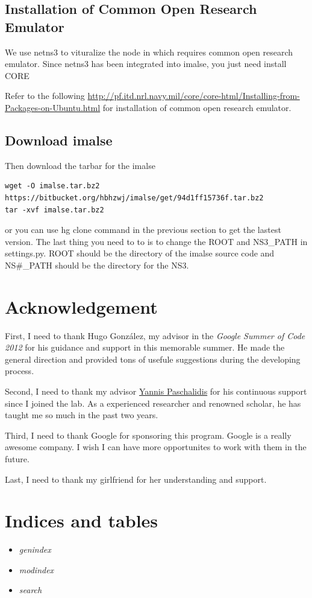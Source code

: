 \documentclass[letterpaper,10pt,english]{sphinxmanual}
\begin{document}
\section{Installation of Common Open Research Emulator}
\label{index:installation-of-common-open-research-emulator}
We use netns3 to vituralize the node in which requires common open research
emulator. Since netns3 has been integrated into imalse, you just need install
CORE

Refer to the following
\href{http://pf.itd.nrl.navy.mil/core/core-html/Installing-from-Packages-on-Ubuntu.html}{http://pf.itd.nrl.navy.mil/core/core-html/Installing-from-Packages-on-Ubuntu.html} for installation of common open research emulator.


\section{Download imalse}
\label{index:download-imalse}
Then download the tarbar for the imalse

\begin{Verbatim}[commandchars=\\\{\}]
wget -O imalse.tar.bz2 https://bitbucket.org/hbhzwj/imalse/get/94d1ff15736f.tar.bz2
tar -xvf imalse.tar.bz2
\end{Verbatim}

or you can use hg clone command in the previous section to get the lastest
version. The last thing you need to to is to change the ROOT and NS3\_PATH in
settings.py. ROOT should be the directory of the imalse source code and NS\#\_PATH
should be the directory for the NS3.


\chapter{Acknowledgement}
\label{index:acknowledgement}
First, I need to thank Hugo González, my advisor in the \emph{Google Summer of Code
2012} for his guidance and support in this memorable summer. He made the general
direction and provided tons of usefule suggestions during the developing process.

Second, I need to thank my advisor \href{http://ionia.bu.edu/}{Yannis Paschalidis} for his continuous support
since I joined the lab. As a experienced researcher and renowned scholar, he has taught me
so much in the past two years.

Third, I need to thank Google for sponsoring this program. Google is a really
awesome company. I wish I can have more opportunites to work with them in the
future.

Last, I need to thank my girlfriend for her understanding and support.


\chapter{Indices and tables}
\label{index:indices-and-tables}\begin{itemize}
\item {} 
\emph{genindex}

\item {} 
\emph{modindex}

\item {} 
\emph{search}

\end{itemize}



\renewcommand{\indexname}{Index}
\printindex
\end{document}

